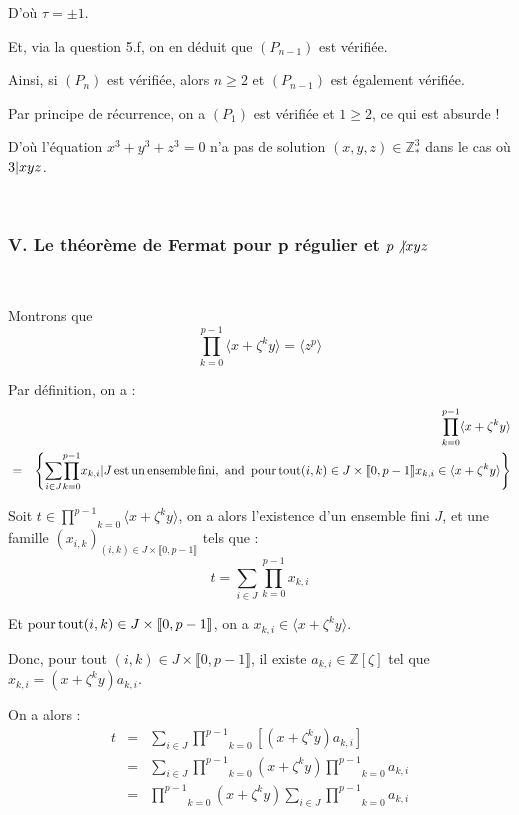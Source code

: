 D'o{\`u} $\tau = \pm 1$.

Et, via la question 5.f, on en d{\'e}duit que $(P_{n - 1})$ est
v{\'e}rifi{\'e}e.

Ainsi, si $(P_n)$ est v{\'e}rifi{\'e}e, alors $n \geqslant 2$ et $(P_{n - 1})$
est {\'e}galement v{\'e}rifi{\'e}e.

Par principe de r{\'e}currence, on a $(P_1)$ est v{\'e}rifi{\'e}e et $1
\geqslant 2$, ce qui est absurde !

D'o{\`u} l'{\'e}quation $x^3 + y^3 + z^3 = 0$ n'a pas de solution $(x, y, z)
\in \mathbb{Z}_{\ast}^3$ dans le cas o{\`u} $3 | x y z $.

\

\subsubsection*{V. Le th{\'e}or{\`e}me de Fermat pour p r{\'e}gulier et $p
\not{| } x y z$}

\

 Montrons que
\[ \underset{k = 0}{\overset{p - 1}{\prod}} \langle x + \zeta^k y \rangle =
   \langle z^p \rangle \]


Par d{\'e}finition, on a :
\begin{eqnarray*}
  &  & \underset{k = 0}{\overset{p - 1}{\prod}} \langle x + \zeta^k y
  \rangle\\
  & = & \left\{ \underset{i \in J}{\sum} \underset{k = 0}{\overset{p -
  1}{\prod}} x_{k, i}  |  J \operatorname{est} \operatorname{un} \operatorname{ensemble}
  \operatorname{fini}, \text{ and } \operatorname{pour} \operatorname{tout} (i, k) \in J \times
  \llbracket 0, p - 1 \rrbracket x_{k, i} \in \langle x + \zeta^k y \rangle
  \right\}
\end{eqnarray*}


Soit $t \in \underset{k = 0}{\overset{p - 1}{\prod}} \langle x + \zeta^k y
\rangle$, on a alors l'existence d'un ensemble fini $J$, et une famille
$(x_{i, k})_{(i, k) \in J \times \llbracket 0, p - 1 \rrbracket}$ tels que :
\[ t = \underset{i \in J}{\sum} \underset{k = 0}{\overset{p - 1}{\prod}} x_{k,
   i} \]


Et p$\operatorname{our} \operatorname{tout} (i, k) \in J \times \llbracket 0, p - 1
\rrbracket$, on a $x_{k, i} \in \langle x + \zeta^k y \rangle$.

Donc, pour tout $(i, k) \in J \times \llbracket 0, p - 1 \rrbracket$, il
existe $a_{k, i} \in \mathbb{Z} [\zeta]$ tel que $x_{k, i} = (x + \zeta^k y)
a_{k, i}$.

On a alors :
\begin{eqnarray*}
  t & = & \underset{i \in J}{\sum} \underset{k = 0}{\overset{p - 1}{\prod}}
  [(x + \zeta^k y) a_{k, i}]\\
  & = & \underset{i \in J}{\sum} \underset{k = 0}{\overset{p - 1}{\prod}} (x
  + \zeta^k y) \underset{k = 0}{\overset{p - 1}{\prod}} a_{k, i}\\
  & = & \underset{k = 0}{\overset{p - 1}{\prod}} (x + \zeta^k y) \underset{i
  \in J}{\sum} \underset{k = 0}{\overset{p - 1}{\prod}} a_{k, i}
\end{eqnarray*}


